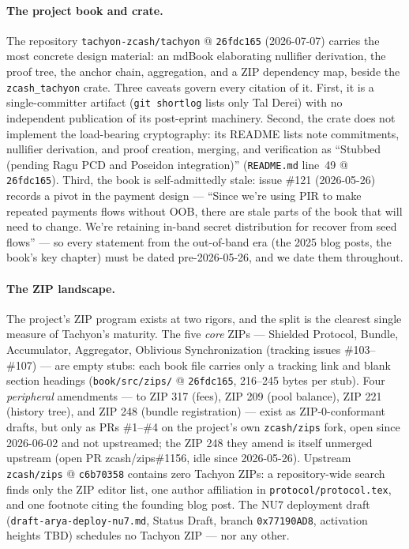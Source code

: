 \documentclass[11pt,a4paper]{article}
\theoremstyle{definition}
\begin{document}
\paragraph{The project book and crate.} The repository
\texttt{tachyon-zcash/tachyon} @ \texttt{26fdc165} (2026-07-07) carries the
most concrete design material: an mdBook elaborating nullifier derivation, the
proof tree, the anchor chain, aggregation, and a ZIP dependency map, beside
the \texttt{zcash\_tachyon} crate. Three caveats govern every citation of it.
First, it is a single-committer artifact (\texttt{git shortlog} lists only Tal
Derei) with no independent publication of its post-eprint machinery. Second,
the crate does not implement the load-bearing cryptography: its README lists
note commitments, nullifier derivation, and proof creation, merging, and
verification as ``Stubbed (pending Ragu PCD and Poseidon integration)''
(\texttt{README.md} line~49 @ \texttt{26fdc165}). Third, the book is
self-admittedly stale: issue \#121 (2026-05-26) records a pivot in the payment
design --- ``Since we're using PIR to make repeated payments flows without
OOB, there are stale parts of the book that will need to change. We're
retaining in-band secret distribution for recover from seed flows'' --- so
every statement from the out-of-band era (the 2025 blog posts, the book's key
chapter) must be dated pre-2026-05-26, and we date them throughout.

\paragraph{The ZIP landscape.} The project's ZIP program exists at two rigors,
and the split is the clearest single measure of Tachyon's maturity. The five
\emph{core} ZIPs --- Shielded Protocol, Bundle, Accumulator, Aggregator,
Oblivious Synchronization (tracking issues \#103--\#107) --- are empty stubs:
each book file carries only a tracking link and blank section headings
(\texttt{book/src/zips/} @ \texttt{26fdc165}, 216--245 bytes per stub). Four
\emph{peripheral} amendments --- to ZIP 317 (fees), ZIP 209 (pool balance),
ZIP 221 (history tree), and ZIP 248 (bundle registration) --- exist as
ZIP-0-conformant drafts, but only as PRs \#1--\#4 on the project's own
\texttt{zcash/zips} fork, open since 2026-06-02 and not upstreamed; the ZIP
248 they amend is itself unmerged upstream (open PR zcash/zips\#1156, idle
since 2026-05-26). Upstream \texttt{zcash/zips} @ \texttt{c6b70358} contains
zero Tachyon ZIPs: a repository-wide search finds only the ZIP editor list,
one author affiliation in \texttt{protocol/protocol.tex}, and one footnote
citing the founding blog post. The NU7 deployment draft
(\texttt{draft-arya-deploy-nu7.md}, Status Draft, branch \texttt{0x77190AD8},
activation heights TBD) schedules no Tachyon ZIP --- nor any other.
\end{document}
